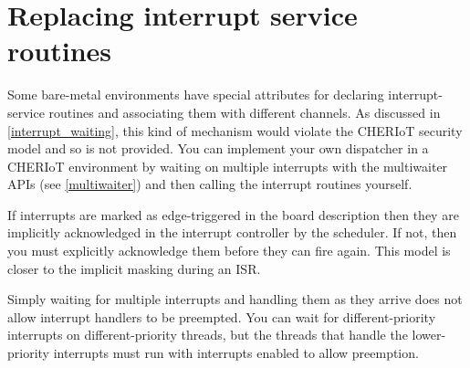 \section{Replacing interrupt service routines}

Some bare-metal environments have special attributes for declaring interrupt-service routines and associating them with different channels.
As discussed in \ref{interrupt_waiting}, this kind of mechanism would violate the CHERIoT security model and so is not provided.
You can implement your own dispatcher in a CHERIoT environment by waiting on multiple interrupts with the multiwaiter APIs (see \ref{multiwaiter}) and then calling the interrupt routines yourself.

If interrupts are marked as edge-triggered in the board description then they are implicitly acknowledged in the interrupt controller by the scheduler.
If not, then you must explicitly acknowledge them before they can fire again.
This model is closer to the implicit masking during an ISR.

\begin{caution}
Simply waiting for multiple interrupts and handling them as they arrive does not allow interrupt handlers to be preempted.
You can wait for different-priority interrupts on different-priority threads, but the threads that handle the lower-priority interrupts must run with interrupts enabled to allow preemption.
\end{caution}
